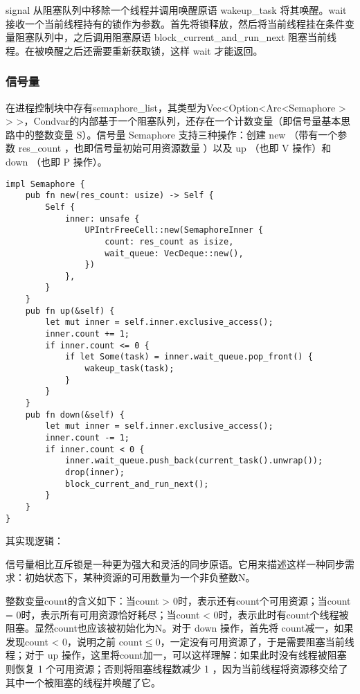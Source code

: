 signal 从阻塞队列中移除一个线程并调用唤醒原语 wakeup\_task 将其唤醒。wait 接收一个当前线程持有的锁作为参数。首先将锁释放，然后将当前线程挂在条件变量阻塞队列中，之后调用阻塞原语 block\_current\_and\_run\_next 阻塞当前线程。在被唤醒之后还需要重新获取锁，这样 wait 才能返回。

\subsubsection{信号量}

在进程控制块中存有semaphore\_list，其类型为Vec<Option<Arc<Semaphore > > >，Condvar的内部基于一个阻塞队列，还存在一个计数变量（即信号量基本思路中的整数变量 S）。信号量 Semaphore 支持三种操作：创建 new （带有一个参数 res\_count ，也即信号量初始可用资源数量 
 ）以及 up （也即 V 操作）和 down （也即 P 操作）。

\begin{lstlisting}[caption=信号量的实现]
impl Semaphore {
    pub fn new(res_count: usize) -> Self {
        Self {
            inner: unsafe {
                UPIntrFreeCell::new(SemaphoreInner {
                    count: res_count as isize,
                    wait_queue: VecDeque::new(),
                })
            },
        }
    }
    pub fn up(&self) {
        let mut inner = self.inner.exclusive_access();
        inner.count += 1;
        if inner.count <= 0 {
            if let Some(task) = inner.wait_queue.pop_front() {
                wakeup_task(task);
            }
        }
    }
    pub fn down(&self) {
        let mut inner = self.inner.exclusive_access();
        inner.count -= 1;
        if inner.count < 0 {
            inner.wait_queue.push_back(current_task().unwrap());
            drop(inner);
            block_current_and_run_next();
        }
    }
}
\end{lstlisting}

其实现逻辑：

信号量相比互斥锁是一种更为强大和灵活的同步原语。它用来描述这样一种同步需求：初始状态下，某种资源的可用数量为一个非负整数$\boldsymbol{\mathrm{N}}$。

整数变量count的含义如下：当count > 0时，表示还有count个可用资源；当count = 0时，表示所有可用资源恰好耗尽；当count < 0时，表示此时有count个线程被阻塞。显然count也应该被初始化为$\boldsymbol{\mathrm{N}}$。对于 down 操作，首先将 count减一，如果发现count < 0，说明之前 $\mathrm{count} \le 0$，一定没有可用资源了，于是需要阻塞当前线程；对于 up 操作，这里将count加一，可以这样理解：如果此时没有线程被阻塞则恢复 1 个可用资源；否则将阻塞线程数减少 1 ，因为当前线程将资源移交给了其中一个被阻塞的线程并唤醒了它。

